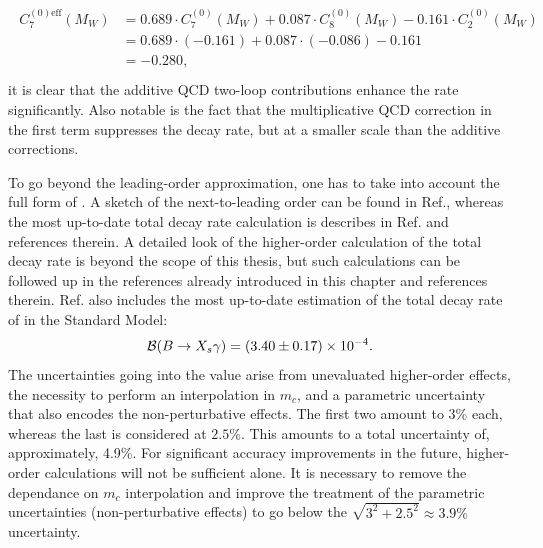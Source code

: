 \begin{align}
    \begin{split}
        C_7^{(0)\mathrm{eff}}(M_W) &= 0.689 \cdot C_7^{(0)}(M_W) + 0.087 \cdot C_8^{(0)}(M_W) - 0.161 \cdot C_2^{(0)}(M_W)  \\ 
                          &= 0.689 \cdot (-0.161) + 0.087 \cdot (-0.086) - 0.161\\
                          &= -0.280, \\
    \end{split}
\end{align}
it is clear that the additive QCD two-loop contributions enhance the rate significantly.
Also notable is the fact that the multiplicative QCD correction in the first term suppresses the decay rate, but at a smaller scale than the additive corrections.



To go beyond the leading-order approximation, one has to take into account the full form of .
A sketch of the next-to-leading order can be found in Ref.\cite{Gambino:2001ew}, whereas the most up-to-date total decay rate calculation is describes in Ref.\cite{Misiak:2020vlo} and references therein.
A detailed look of the higher-order calculation of the total \BtoXsgamma decay rate is beyond the scope of this thesis, but such calculations can be followed up in the references already introduced in this chapter and references therein. 
Ref.\cite{Misiak:2020vlo} also includes the most up-to-date estimation of the total decay rate of \BtoXsgamma in the Standard Model:
\begin{equation}
    \mathcal{B}({B\rightarrow X_{s} \gamma}) = (3.40\pm 0.17) \times 10^{-4}.
\end{equation}
The uncertainties going into the value arise from unevaluated higher-order effects, the necessity to perform an interpolation in $m_c$, and a parametric uncertainty that also encodes the non-perturbative effects.
The first two amount to $3\%$ each, whereas the last is considered at $2.5\%$. 
This amounts to a total uncertainty of, approximately, 4.9\%.
For significant accuracy improvements in the future, higher-order calculations will not be sufficient alone.
It is necessary to remove the dependance on $m_c$ interpolation and improve the treatment of the parametric uncertainties (non-perturbative effects) to go below the $\sqrt{3^2+2.5^2}\approx3.9\%$ uncertainty.

